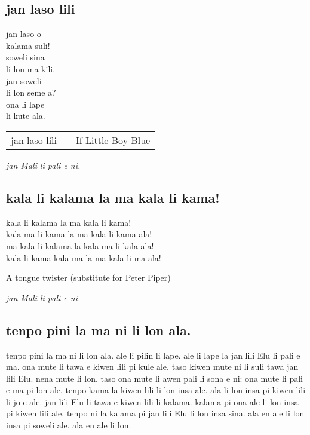 \subsection{jan laso lili}

jan laso o  \\
kalama suli!  \\
soweli sina  \\
li lon ma kili.  \\
jan soweli  \\
li lon seme a?  \\
ona li lape  \\
li kute ala.  \\

\begin{supertabular}{p{5,5cm}|ll}
    jan laso lili &  & If Little Boy Blue \\
\end{supertabular}

\textit{jan Mali li pali e ni. \cite{www:astrodonunt:01}}

\subsection{kala li kalama la ma kala li kama!}

kala li kalama la ma kala li kama!           \\
kala ma li kama la ma kala li kama ala!      \\
ma kala li kalama la kala ma li kala ala!    \\
kala li kama kala ma la ma kala li ma ala!

A tongue twister (substitute for Peter Piper)

\textit{jan Mali li pali e ni. \cite{www:astrodonunt:01}}

\subsection{tenpo pini la ma ni li lon ala.}

tenpo pini la ma ni li lon ala.
ale li pilin li lape.
ale li lape la jan lili Elu li pali e ma.
ona mute li tawa e kiwen lili pi kule ale.
taso kiwen mute ni li suli tawa jan lili Elu.
nena mute li lon.
taso ona mute li awen pali li sona e ni: ona mute li pali e ma pi lon ale.
tenpo kama la kiwen lili li lon insa ale.
ala li lon insa pi kiwen lili li jo e ale.
jan lili Elu li tawa e kiwen lili li kalama.
kalama pi ona ale li lon insa pi kiwen lili ale.
tenpo ni la kalama pi jan lili Elu li lon insa sina.
ala en ale li lon insa pi soweli ale.
ala en ale li lon.


